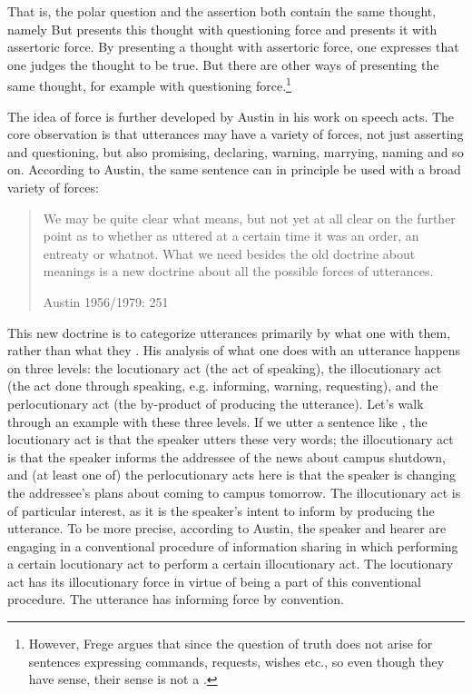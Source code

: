 That is, the polar question  and the assertion  both contain the same thought, namely   But  presents this thought with questioning force and  presents it with assertoric force. By presenting a thought with assertoric force, one expresses that one judges the thought to be true. But there are other ways of presenting the same thought, for example with questioning force.\footnote{However, Frege argues that since the question of truth does not arise for sentences expressing commands, requests, wishes etc., so even though they have sense, their sense is not a .}

The idea of force is further developed by Austin in his work on speech acts. The core observation is that utterances may have a variety of forces, not just asserting and questioning, but also promising, declaring, warning, marrying, naming and so on. According to Austin, the same sentence can in principle be used with a broad variety of forces:

\begin{quote}
    
We may be quite clear what  means, but not yet at all clear on the further point as to whether as uttered at a certain time it was an order, an entreaty or whatnot. What we need besides the old doctrine about meanings is a new doctrine about all the possible forces of utterances.

\hfill Austin 1956/1979: 251
\end{quote}

This new doctrine is to categorize utterances primarily by what one  with them, rather than what they . His analysis of what one does with an utterance happens on three levels: the locutionary act (the act of speaking), the illocutionary act (the act done through speaking, e.g. informing, warning, requesting), and the perlocutionary act (the by-product of producing the utterance). Let’s walk through an example with these three levels. If we utter a sentence like , the locutionary act is that the speaker utters these very words; the illocutionary act is that the speaker informs the addressee of the news about campus shutdown, and (at least one of) the perlocutionary acts here is that the speaker is changing the addressee’s plans about coming to campus tomorrow. The illocutionary act is of particular interest, as it is the speaker’s intent to inform by producing the utterance. To be more precise, according to Austin, the speaker and hearer are engaging in a conventional procedure of information sharing in which performing a certain locutionary act  to perform a certain illocutionary act. The locutionary act has its illocutionary force in virtue of being a part of this conventional procedure. The utterance has informing force by convention.


